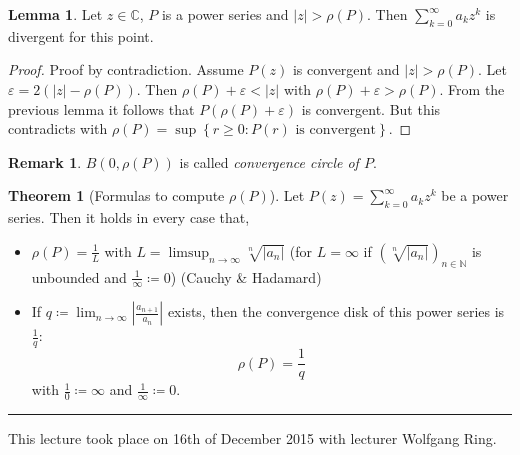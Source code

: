 \documentclass[a4paper,landscape,twocolumn]{article}
\theoremstyle{definition}
\newtheorem{theorem}{Theorem}
\newtheorem{rem}{Remark}
\newtheorem{lemma}{Lemma}
\newcommand\set[1]{\left\{#1\right\}}
\newcommand\abs[1]{\left|#1\right|}
\newcommand\seq[1]{{\left(#1\right)}_{n \in \mathbb N}}
\newcommand\meta[3]{\hrule{} This #1 took place on #2 with lecturer #3.\par}
\begin{document}
\begin{lemma}
  Let $z \in \mathbb C$, $P$ is a power series and $\abs{z} > \rho(P)$.
  Then $\sum_{k=0}^\infty a_k z^k$ is divergent for this point.
\end{lemma}
\begin{proof}
  Proof by contradiction. Assume $P(z)$ is convergent and $\abs{z} > \rho(P)$.
  Let $\varepsilon = 2(\abs{z} - \rho(P))$. Then $\rho(P) + \varepsilon < \abs{z}$
  with $\rho(P) + \varepsilon > \rho(P)$. From the previous lemma it follows that
  $P(\rho(P) + \varepsilon)$ is convergent. But this contradicts with $\rho(P)
  = \sup\set{r \geq 0: P(r) \text{ is convergent}}$.
\end{proof}
\begin{rem}
  $B(0,\rho(P))$ is called \emph{convergence circle of $P$}.
\end{rem}
\begin{theorem}[Formulas to compute $\rho(P)$]
  Let $P(z) = \sum_{k=0}^\infty a_k z^k$ be a power series.
  Then it holds in every case that,
  \begin{itemize}
    \item $\rho(P) = \frac{1}{L}$ with $L = \limsup_{n\to\infty} \sqrt[n]{\abs{a_n}}$
      (for $L = \infty$ if $\seq{\sqrt[n]{\abs{a_n}}}$ is unbounded and $\frac{1}{\infty} \coloneqq 0$)
      (Cauchy \& Hadamard)
    \item
      If $q \coloneqq \lim_{n\to\infty} \abs{\frac{a_{n+1}}{a_n}}$ exists,
      then the convergence disk of this power series is $\frac1q$:
      \[ \rho(P) = \frac{1}{q} \]
      with $\frac10 \coloneqq \infty$ and $\frac1{\infty} \coloneqq 0$.
  \end{itemize}
\end{theorem}

\meta{lecture}{16th of December 2015}{Wolfgang Ring}
\end{document}
